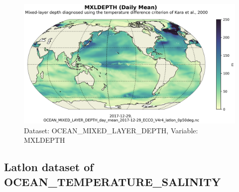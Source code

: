 \begin{figure}[H]
\centering
\includegraphics[scale=0.55]{../images/plots/latlon_plots/Ocean_Mixed_Layer_Depth/MXLDEPTH.png}
\caption{Dataset: OCEAN\_MIXED\_LAYER\_DEPTH, Variable: MXLDEPTH}
\label{tab:table-OCEAN_MIXED_LAYER_DEPTH_MXLDEPTH-Plot}
\end{figure}
\subsection{Latlon dataset of OCEAN\_TEMPERATURE\_SALINITY}
\newp
